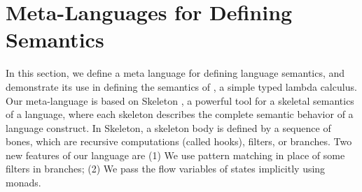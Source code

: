 \section{Meta-Languages for Defining Semantics}\label{sec:host}

In this section, we define a meta language for defining language semantics, and demonstrate its use in defining the semantics of \STLC{}, a simple typed lambda calculus.
Our meta-language is based on Skeleton \cite{skeleton}, a powerful tool 
for a skeletal semantics of a language, where each skeleton describes the complete semantic behavior of a language construct. 
In Skeleton, 
a skeleton body is defined by a sequence of bones,
which are recursive computations (called hooks), filters, or branches.
Two new features of our language are
(1) We use pattern matching in place of some filters in branches;
(2) We pass the flow variables of states implicitly using monads.



